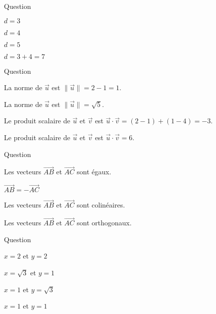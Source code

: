 

\begin{multi}[multiple,feedback=
{D'abord, \(\overrightarrow{AB}=(-3,4)\). Donc \(d=\sqrt{(-3)^2+4^2}=\sqrt{25}=5\).
}]{Question}
    \item \(d=3\)
    \item \(d=4\)
    \item* \(d=5\)
    \item \(d=3+4=7\)
\end{multi}


\begin{multi}[multiple,feedback=
{Penser aux définitions : si \(\vec{u}=(x,y)\) et \(\vec{v}=(x',y')\) alors
\(\vec{u}\cdot \vec{v} = xx'+yy'\) et \(\|\vec{u}\| = \sqrt{\vec{u}\cdot \vec{u}}
= \sqrt{x^2+y^2}\).
}]{Question}
    \item La norme de \(\vec{u}\) est \(\|\vec{u}\|=2-1=1\).
    \item* La norme de \(\vec{u}\) est \(\|\vec{u}\|=\sqrt{5}\).
    \item Le produit scalaire de \(\vec{u}\) et \(\vec{v}\) est \(\vec{u}\cdot \vec{v}=(2-1)+(1-4)=-3\).
    \item* Le produit scalaire de \(\vec{u}\) et \(\vec{v}\) est \(\vec{u}\cdot \vec{v}=6\).
\end{multi}


\begin{multi}[multiple,feedback=
{D'abord, \(\overrightarrow{AB}=(-2,0)\) et \(\overrightarrow{AC}=(0,-2)\), et puis le produit scalaire \(\overrightarrow{AB}\cdot\overrightarrow{AC}\) est nul. Donc \(\overrightarrow{AB}\) et \(\overrightarrow{AC}\) sont orthogonaux.
}]{Question}
    \item Les vecteurs \(\overrightarrow{AB}\) et \(\overrightarrow{AC}\) sont égaux.
    \item \(\overrightarrow{AB}=-\overrightarrow{AC}\)
    \item Les vecteurs \(\overrightarrow{AB}\) et \(\overrightarrow{AC}\) sont colinéaires.
    \item* Les vecteurs \(\overrightarrow{AB}\) et \(\overrightarrow{AC}\) sont orthogonaux.
\end{multi}


\begin{multi}[multiple,feedback=
{Les deux systèmes de coordonnées sont reliés par les relations \(x=r\cos \theta\) et \(y=r\sin \theta \).
}]{Question}
    \item \(x=2\) et \(y=2\)
    \item* \(x=\sqrt{3}\) et \(y=1\)
    \item \(x=1\) et \(y=\sqrt{3}\)
    \item \(x=1\) et \(y=1\)
\end{multi}


